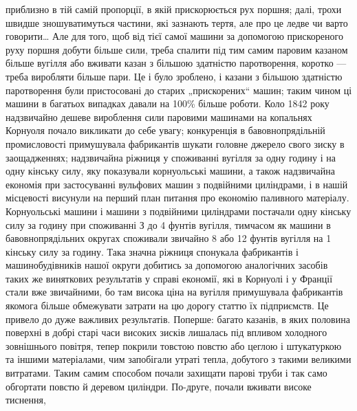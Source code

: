 приблизно в тій самій пропорції, в якій прискорюється рух поршня;
далі, трохи швидше зношуватимуться частини, які зазнають
тертя, але про це ледве чи варто говорити\dots{} Але для того, щоб
від тієї самої машини за допомогою прискореного руху поршня
добути більше сили, треба спалити під тим самим паровим казаном більше вугілля або вживати казан з
більшою здатністю паротворення, коротко — треба виробляти більше пари. Це і було
зроблено, і казани з більшою здатністю паротворення були пристосовані до старих „прискорених“ машин;
таким чином ці машини в багатьох випадках давали на 100\% більше роботи. Коло
1842 року надзвичайно дешеве вироблення сили паровими машинами на копальнях Корнуоля почало
викликати до себе увагу;
конкуренція в бавовнопрядільній промисловості примушувала
фабрикантів шукати головне джерело свого зиску в заощадженнях; надзвичайна ріжниця у споживанні
вугілля за одну годину
і на одну кінську силу, яку показували корнуольські машини,
а також надзвичайна економія при застосуванні вульфових машин
з подвійними циліндрами, і в нашій місцевості висунули на перший
план питання про економію паливного матеріалу. Корнуольські
машини і машини з подвійними циліндрами постачали одну кінську
силу за годину при споживанні З  до 4 фунтів вугілля, тимчасом як машини в бавовнопрядільних
округах споживали звичайно 8 або 12 фунтів вугілля на 1 кінську силу за годину.
Така значна ріжниця спонукала фабрикантів і машинобудівників
нашої округи добитись за допомогою аналогічних засобів таких же
виняткових результатів у справі економії, які в Корнуолі і у Франції стали вже звичайними, бо там
висока ціна на вугілля примушувала фабрикантів якомога більше обмежувати затрати на цю дорогу статтю
їх підприємств. Це привело до дуже важливих результатів. Поперше: багато казанів, в яких половина
поверхні в добрі
старі часи високих зисків лишалась під впливом холодного зовнішнього повітря, тепер покрили товстою
повстю або цеглою і штукатуркою та іншими матеріалами, чим запобігали утраті тепла,
добутого з такими великими витратами. Таким самим способом
почали захищати парові труби і так само обгортати повстю й деревом циліндри. По-друге, почали
вживати високе тиснення,
\parbreak{}  %

